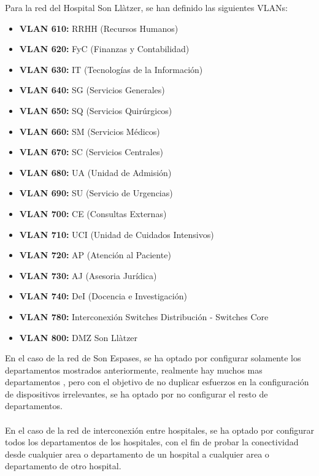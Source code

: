 Para la red del Hospital Son Llàtzer, se han definido las siguientes VLANs:
\begin{itemize}
    \item \textbf{VLAN 610:} RRHH (Recursos Humanos)
    \item \textbf{VLAN 620:} FyC (Finanzas y Contabilidad)
    \item \textbf{VLAN 630:} IT (Tecnologías de la Información)
    \item \textbf{VLAN 640:} SG (Servicios Generales)
    \item \textbf{VLAN 650:} SQ (Servicios Quirúrgicos)
    \item \textbf{VLAN 660:} SM (Servicios Médicos)
    \item \textbf{VLAN 670:} SC (Servicios Centrales)
    \item \textbf{VLAN 680:} UA (Unidad de Admisión)
    \item \textbf{VLAN 690:} SU (Servicio de Urgencias)
    \item \textbf{VLAN 700:} CE (Consultas Externas)
    \item \textbf{VLAN 710:} UCI (Unidad de Cuidados Intensivos)
    \item \textbf{VLAN 720:} AP (Atención al Paciente)
    \item \textbf{VLAN 730:} AJ (Asesoria Jurídica)
    \item \textbf{VLAN 740:} DeI (Docencia e Investigación)
    \item \textbf{VLAN 780:} Interconexión Switches Distribución - Switches Core
    \item \textbf{VLAN 800:} DMZ Son Llàtzer
\end{itemize}

En el caso de la red de Son Espases, se ha optado por configurar solamente los departamentos mostrados anteriormente, realmente hay muchos mas departamentos \cite{GerenciaSonEspases}, pero con el objetivo
de no duplicar esfuerzos en la configuración de dispositivos irrelevantes, se ha optado por no configurar el resto de departamentos.
\\ \\
En el caso de la red de interconexión entre hospitales, se ha optado por configurar todos los departamentos de los hospitales, con el fin de probar la conectividad desde cualquier area o 
departamento de un hospital a cualquier area o departamento de otro hospital.

